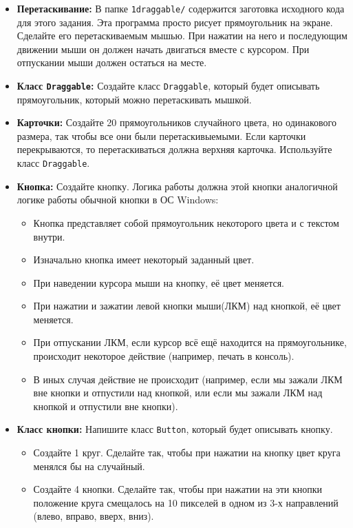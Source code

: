 \documentclass{article}
\begin{document}
\begin{itemize}
\item \textbf{Перетаскивание:} В папке \texttt{1draggable/} содержится заготовка исходного кода для этого задания. Эта программа просто рисует прямоугольник на экране. Сделайте его перетаскиваемым мышью. При нажатии на него и последующим движении мыши он должен начать двигаться вместе с курсором. При отпускании мыши должен остаться на месте.

\item \textbf{Класс \texttt{Draggable}:} Создайте класс \texttt{Draggable}, который будет описывать прямоугольник, который можно перетаскивать мышкой.

\item \textbf{Карточки:} Создайте 20 прямоугольников случайного цвета, но одинакового размера, так чтобы все они были перетаскивыемыми. Если карточки перекрываются, то перетаскиваться должна верхняя карточка. Используйте класс \texttt{Draggable}.


\item \textbf{Кнопка:} Создайте кнопку. Логика работы должна этой кнопки аналогичной логике работы обычной кнопки в ОС Windows:
\begin{itemize}
\item Кнопка представляет собой прямоугольник некоторого цвета и с текстом внутри.
\item Изначально кнопка имеет некоторый заданный цвет.
\item При наведении курсора мыши на кнопку, её цвет меняется.
\item При нажатии и зажатии левой кнопки мыши(ЛКМ) над кнопкой, её цвет меняется.
\item При отпускании ЛКМ, если курсор всё ещё находится на прямоугольнике, происходит некоторое действие (например, печать в консоль).
\item В иных случая действие не происходит (например, если мы зажали ЛКМ вне кнопки и отпустили над кнопкой, или если мы зажали ЛКМ над кнопкой и отпустили вне кнопки).
\end{itemize}

\item \textbf{Класс кнопки:}  Напишите класс \texttt{Button}, который будет описывать кнопку. 
\begin{itemize}
\item Создайте 1 круг. Сделайте так, чтобы при нажатии на кнопку цвет круга менялся бы на случайный.
\item Создайте 4 кнопки. Сделайте так, чтобы при нажатии на эти кнопки положение круга смещалось на 10 пикселей в одном из 3-х направлений (влево, вправо, вверх, вниз).
\end{itemize}
	

\end{itemize}
\end{document}
